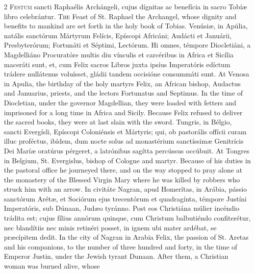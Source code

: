 \begin{paracol}{2}
\lettrine[lines=2]{F}{estum} sancti Raphaélis 
 Archángeli, cujus dígnitas ac benefícia in sacro Tobíæ libro celebrántur.
\switchcolumn
{}
\lettrine[lines=2]{T}{he} Feast of St. Raphael the 
 Archangel, whose dignity and benefits to mankind are set forth in the holy 
 book of Tobias.
\switchcolumn*
{}
Venúsiæ, in Apúlia, natális sanctórum Mártyrum Felícis, Epíscopi Africáni; Audácti et Januárii, 
 Presbyterórum; Fortunáti et Séptimi, Lectórum. Hi omnes, témpore 
 Diocletiáni, a Magdelliáno Procuratóre multis diu vínculis et carcéribus in 
 Africa et Sicília maceráti sunt, et, cum Felix sacros Libros juxta ipsíus 
 Imperatóris edíctum trádere nullátenus voluísset, gládii tandem occisióne 
 consummáti sunt.
\switchcolumn
{}
At Venosa in Apulia, the birthday of 
 the holy martyrs Felix, an African bishop, Audactus and Januarius, priests, 
 and the lectors Fortunatus and Septimus. In the time of Diocletian, 
 under the governor Magdellian, they were loaded with fetters and imprisoned 
 for a long time in Africa and Sicily. Because Felix refused to deliver 
 the sacred books, they were at last slain with the sword.
\switchcolumn*
{}
Tungris, in Bélgio, 
 sancti Evergísli, Epíscopi Coloniénsis et Mártyris; qui, ob pastorális 
 offícii curam illuc proféctus, ibídem, dum nocte solus ad monastérium 
 sanctíssimæ Genitrícis Dei Maríæ oratúrus pérgeret, a latrónibus sagítta 
 percússus occúbuit.
\switchcolumn
{}
At Tongres in Belgium, St. 
 Evergislus, bishop of Cologne and martyr. Because of his duties in the 
 pastoral office he journeyed there, and on the way stopped to pray alone at 
 the monastery of the Blessed Virgin Mary where he was killed by robbers who 
 struck him with an arrow.
\switchcolumn*
{}
In civitáte Nagran, 
 apud Homerítas, in Arábia, pássio sanctórum Arétæ, et Sociórum ejus 
 trecentórum et quadragínta, témpore Justíni Imperatóris, sub Dúnaan, Judæo 
 tyránno. Post eos Christiána múlier incéndio trádita est; cujus fílius 
 annórum quinque, cum Christum balbutiéndo confiterétur, nec blandítiis nec 
 minis retinéri posset, in ignem ubi mater ardébat, se præcípitem dedit.
\switchcolumn
{}
In the city of Nagran in Arabia 
 Felix, the passion of St. Aretas and his companions, to the number of three 
 hundred and forty, in the time of Emperor Justin, under the Jewish tyrant 
 Dunaan. After them, a Christian woman was burned alive, whose 

\end{paracol}
